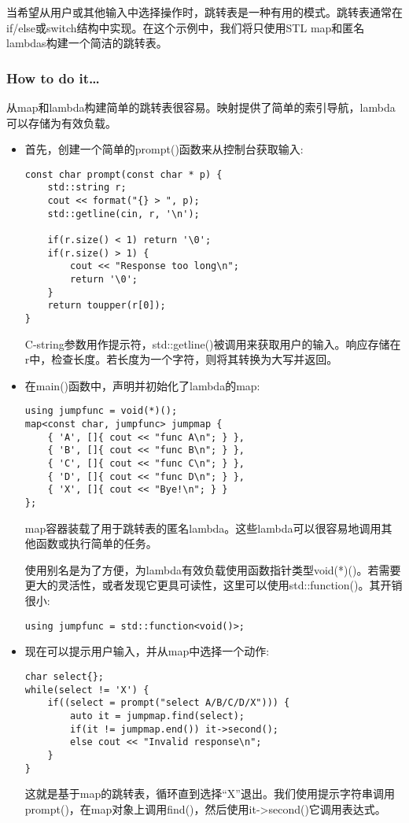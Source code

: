 
当希望从用户或其他输入中选择操作时，跳转表是一种有用的模式。跳转表通常在if/else或switch结构中实现。在这个示例中，我们将只使用STL map和匿名lambdas构建一个简洁的跳转表。


\subsubsection{How to do it…}

从map和lambda构建简单的跳转表很容易。映射提供了简单的索引导航，lambda可以存储为有效负载。

\begin{itemize}
\item 
首先，创建一个简单的prompt()函数来从控制台获取输入:

\begin{lstlisting}[style=styleCXX]
const char prompt(const char * p) {
	std::string r;
	cout << format("{} > ", p);
	std::getline(cin, r, '\n');
	
	if(r.size() < 1) return '\0';
	if(r.size() > 1) {
		cout << "Response too long\n";
		return '\0';
	}
	return toupper(r[0]);
}
\end{lstlisting}

C-string参数用作提示符，std::getline()被调用来获取用户的输入。响应存储在r中，检查长度。若长度为一个字符，则将其转换为大写并返回。

\item 
在main()函数中，声明并初始化了lambda的map:

\begin{lstlisting}[style=styleCXX]
using jumpfunc = void(*)();
map<const char, jumpfunc> jumpmap {
	{ 'A', []{ cout << "func A\n"; } },
	{ 'B', []{ cout << "func B\n"; } },
	{ 'C', []{ cout << "func C\n"; } },
	{ 'D', []{ cout << "func D\n"; } },
	{ 'X', []{ cout << "Bye!\n"; } }
};
\end{lstlisting}

map容器装载了用于跳转表的匿名lambda。这些lambda可以很容易地调用其他函数或执行简单的任务。

使用别名是为了方便，为lambda有效负载使用函数指针类型void(*)()。若需要更大的灵活性，或者发现它更具可读性，这里可以使用std::function()。其开销很小:

\begin{lstlisting}[style=styleCXX]
using jumpfunc = std::function<void()>;
\end{lstlisting}

\item 
现在可以提示用户输入，并从map中选择一个动作:

\begin{lstlisting}[style=styleCXX]
char select{};
while(select != 'X') {
	if((select = prompt("select A/B/C/D/X"))) {
		auto it = jumpmap.find(select);
		if(it != jumpmap.end()) it->second();
		else cout << "Invalid response\n";
	}
}
\end{lstlisting}

这就是基于map的跳转表，循环直到选择“X”退出。我们使用提示字符串调用prompt()，在map对象上调用find()，然后使用it->second()它调用表达式。
\end{itemize}


